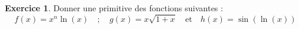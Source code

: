 \documentclass[a4paper, 11pt,openany]{article}%
\theoremstyle{plain}
\theoremstyle{definition}
\newtheorem{exo}{Exercice}
\newtheorem{sol}{Solution de l'exercice}
\theoremstyle{remark}
\begin{document}
\begin{exo}
Donner une primitive des fonctions suivantes :
\[ f(x) = x^n \ln(x)\quad ; \quad
g(x) = x\sqrt{1+x} \quad \text{et} \quad h(x) = \sin(\ln(x))\]
\end{exo}


\end{document}
